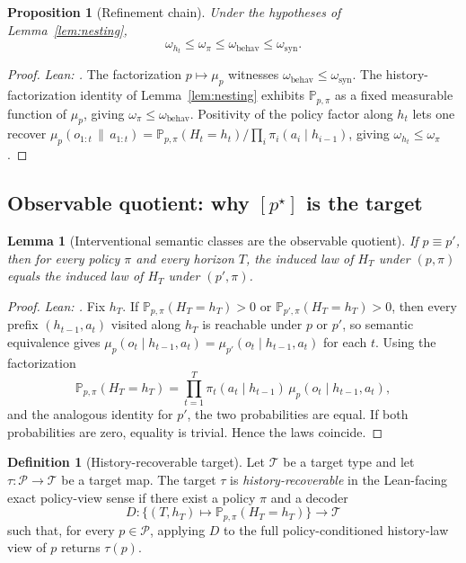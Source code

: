 \documentclass[11pt]{article}
\newtheorem{proposition}[theorem]{Proposition}
\newtheorem{lemma}[theorem]{Lemma}
\theoremstyle{definition}
\newtheorem{definition}[theorem]{Definition}
\theoremstyle{remark}
\theoremstyle{plain}
\theoremstyle{definition}
\newcommand{\Pcal}{\mathcal{P}}
\newcommand{\Prob}{\mathbb{P}}
\newcommand{\givena}{\,\|\,}
\begin{document}
\begin{proposition}[Refinement chain]
\label{prop:refinement-chain}
Under the hypotheses of Lemma~\ref{lem:nesting},
\[
\omega_{h_t}\le\omega_\pi\le\omega_{\mathrm{behav}}\le\omega_{\mathrm{syn}}.
\]
\end{proposition}

\begin{proof}
\noindent\emph{Lean: .}
The factorization $p\mapsto\mu_p$ witnesses $\omega_{\mathrm{behav}}\le\omega_{\mathrm{syn}}$. The history-factorization identity of Lemma~\ref{lem:nesting} exhibits $\Prob_{p,\pi}$ as a fixed measurable function of $\mu_p$, giving $\omega_\pi\le\omega_{\mathrm{behav}}$. Positivity of the policy factor along $h_t$ lets one recover $\mu_p(o_{1:t}\givena a_{1:t})=\Prob_{p,\pi}(H_t=h_t)/\prod_i\pi_i(a_i\mid h_{i-1})$, giving $\omega_{h_t}\le\omega_\pi$.
\end{proof}

\subsection{Observable quotient: why $[p^\star]$ is the target}

\begin{lemma}[Interventional semantic classes are the observable quotient]
\label{lem:observable-quotient}
If $p\equiv p'$, then for every policy $\pi$ and every horizon $T$, the induced law of $H_T$ under $(p,\pi)$ equals the induced law of $H_T$ under $(p',\pi)$.
\end{lemma}

\begin{proof}
\noindent\emph{Lean: .}
Fix $h_T$. If $\Prob_{p,\pi}(H_T=h_T)>0$ or $\Prob_{p',\pi}(H_T=h_T)>0$, then every prefix $(h_{t-1},a_t)$ visited along $h_T$ is reachable under $p$ or $p'$, so semantic equivalence gives $\mu_p(o_t\mid h_{t-1},a_t)=\mu_{p'}(o_t\mid h_{t-1},a_t)$ for each $t$. Using the factorization
\[
\Prob_{p,\pi}(H_T=h_T)
=
\prod_{t=1}^{T}\pi_t(a_t\mid h_{t-1})\,\mu_p(o_t\mid h_{t-1},a_t),
\]
and the analogous identity for $p'$, the two probabilities are equal. If both probabilities are zero, equality is trivial. Hence the laws coincide.
\end{proof}

\begin{definition}[History-recoverable target]
\label{def:history-recoverable}
Let $\mathcal{T}$ be a target type and let $\tau:\Pcal\to\mathcal{T}$ be a target map. The target $\tau$ is \emph{history-recoverable} in the Lean-facing exact policy-view sense if there exist a policy $\pi$ and a decoder
\[
D:\bigl\{(T,h_T)\mapsto \Prob_{p,\pi}(H_T=h_T)\bigr\}\longrightarrow \mathcal{T}
\]
such that, for every $p\in\Pcal$, applying $D$ to the full policy-conditioned history-law view of $p$ returns $\tau(p)$.
\end{definition}
\end{document}
